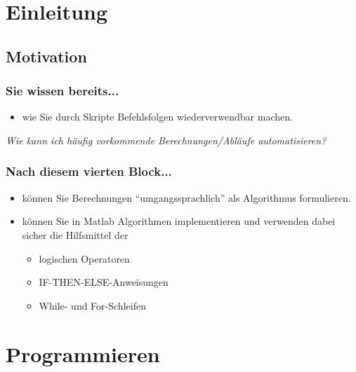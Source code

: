 



\setcounter{mchapter}{4}
\setcounter{mexercise}{0}


  

  \section{Einleitung}

  \subsection{Motivation}
  \begin{frame}
      \frametitle{Sie wissen bereits...}
      \begin{itemize}
          \item wie Sie durch Skripte Befehlsfolgen wiederverwendbar machen.
      \end{itemize}

      \textit{Wie kann ich häufig vorkommende Berechnungen/Abläufe automatisieren?}
  \end{frame}

  \begin{frame}
      \frametitle{Nach diesem vierten Block...}
      \begin{itemize}
          \item können Sie Berechnungen ``umgangssprachlich'' als Algorithmus formulieren.
          \item können Sie in Matlab Algorithmen implementieren und verwenden dabei sicher die Hilfsmittel der
          \begin{itemize}
              \item logischen Operatoren
              \item IF-THEN-ELSE-Anweisungen
              \item While- und For-Schleifen
          \end{itemize}
      \end{itemize}
  \end{frame}

  \section{Programmieren}

